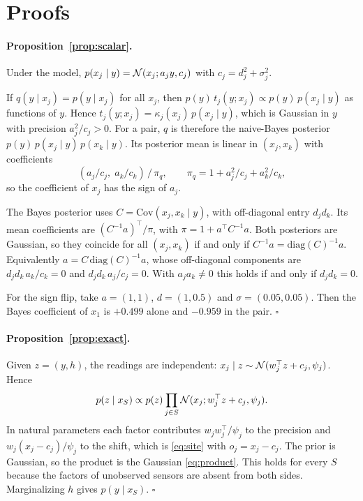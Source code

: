 \section{Proofs}
\label{app:proofs}

\paragraph{Proposition~\ref{prop:scalar}.}
Under the model, $p(x_j\mid y)=\mathcal{N}(x_j;a_jy,c_j)$ with $c_j=d_j^2+\sigma_j^2$.

If $q(y\mid x_j)=p(y\mid x_j)$ for all $x_j$, then $p(y)\,t_j(y;x_j)\propto p(y)\,p(x_j\mid y)$ as functions of $y$.
Hence $t_j(y;x_j)=\kappa_j(x_j)\,p(x_j\mid y)$, which is Gaussian in $y$ with precision $a_j^2/c_j>0$. For a pair, $q$
is therefore the naive-Bayes posterior $p(y)\,p(x_j\mid y)\,p(x_k\mid y)$. Its posterior mean is linear in
$(x_j,x_k)$ with coefficients
\[
  (a_j/c_j,\;a_k/c_k)\,/\,\pi_q, \qquad \pi_q=1+a_j^2/c_j+a_k^2/c_k ,
\]
so the coefficient of $x_j$ has the sign of $a_j$.

The Bayes posterior uses $C=\mathrm{Cov}(x_j,x_k\mid y)$, with off-diagonal entry $d_jd_k$. Its mean coefficients are
$(C^{-1}a)^\top/\pi$, with $\pi=1+a^\top C^{-1}a$. Both posteriors are Gaussian, so they coincide for all $(x_j,x_k)$
if and only if $C^{-1}a=\mathrm{diag}(C)^{-1}a$. Equivalently $a=C\,\mathrm{diag}(C)^{-1}a$, whose off-diagonal
components are $d_jd_k\,a_k/c_k=0$ and $d_jd_k\,a_j/c_j=0$. With $a_ja_k\neq0$ this holds if and only if $d_jd_k=0$.

For the sign flip, take $a=(1,1)$, $d=(1,0.5)$ and $\sigma=(0.05,0.05)$. Then the Bayes coefficient of $x_1$ is
$+0.499$ alone and $-0.959$ in the pair. \hfill$\square$

\paragraph{Proposition~\ref{prop:exact}.}
Given $z=(y,h)$, the readings are independent: $x_j\mid z\sim\mathcal{N}(w_j^\top z+c_j,\psi_j)$. Hence
\[
  p(z\mid x_S)\propto p(z)\prod_{j\in S}\mathcal{N}(x_j;w_j^\top z+c_j,\psi_j).
\]
In natural parameters each factor contributes $w_jw_j^\top/\psi_j$ to the precision and $w_j(x_j-c_j)/\psi_j$ to the
shift, which is \eqref{eq:site} with $o_j=x_j-c_j$. The prior is Gaussian, so the product is the Gaussian
\eqref{eq:product}. This holds for every $S$ because the factors of unobserved sensors are absent from both sides.
Marginalizing $h$ gives $p(y\mid x_S)$. \hfill$\square$

